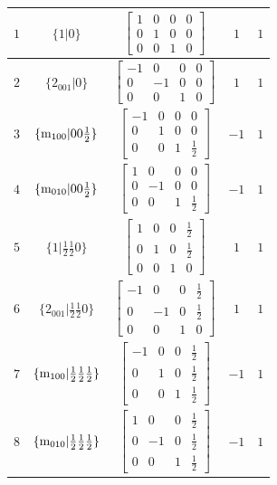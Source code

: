\documentclass[fleqn,8pt]{jsarticle}
\begin{document}
\begin{longtable}{ccccc}
$ 1 $ & $ \{1|0\} $ & $ \begin{bmatrix} 1 & 0 & 0 & 0 \\ 0 & 1 & 0 & 0 \\ 0 & 0 & 1 & 0 \end{bmatrix} $ & $ 1 $ & $ 1 $ \\ \hline
$ 2 $ & $ \{2{}_{001}|0\} $ & $ \begin{bmatrix} -1 & 0 & 0 & 0 \\ 0 & -1 & 0 & 0 \\ 0 & 0 & 1 & 0 \end{bmatrix} $ & $ 1 $ & $ 1 $ \\ \hline
$ 3 $ & $ \{{\rm m}_{100}|0 0 \frac{1}{2}\} $ & $ \begin{bmatrix} -1 & 0 & 0 & 0 \\ 0 & 1 & 0 & 0 \\ 0 & 0 & 1 & \frac{1}{2} \end{bmatrix} $ & $ -1 $ & $ 1 $ \\ \hline
$ 4 $ & $ \{{\rm m}_{010}|0 0 \frac{1}{2}\} $ & $ \begin{bmatrix} 1 & 0 & 0 & 0 \\ 0 & -1 & 0 & 0 \\ 0 & 0 & 1 & \frac{1}{2} \end{bmatrix} $ & $ -1 $ & $ 1 $ \\ \hline
$ 5 $ & $ \{1|\frac{1}{2} \frac{1}{2} 0\} $ & $ \begin{bmatrix} 1 & 0 & 0 & \frac{1}{2} \\ 0 & 1 & 0 & \frac{1}{2} \\ 0 & 0 & 1 & 0 \end{bmatrix} $ & $ 1 $ & $ 1 $ \\ \hline
$ 6 $ & $ \{2{}_{001}|\frac{1}{2} \frac{1}{2} 0\} $ & $ \begin{bmatrix} -1 & 0 & 0 & \frac{1}{2} \\ 0 & -1 & 0 & \frac{1}{2} \\ 0 & 0 & 1 & 0 \end{bmatrix} $ & $ 1 $ & $ 1 $ \\ \hline
$ 7 $ & $ \{{\rm m}_{100}|\frac{1}{2} \frac{1}{2} \frac{1}{2}\} $ & $ \begin{bmatrix} -1 & 0 & 0 & \frac{1}{2} \\ 0 & 1 & 0 & \frac{1}{2} \\ 0 & 0 & 1 & \frac{1}{2} \end{bmatrix} $ & $ -1 $ & $ 1 $ \\ \hline
$ 8 $ & $ \{{\rm m}_{010}|\frac{1}{2} \frac{1}{2} \frac{1}{2}\} $ & $ \begin{bmatrix} 1 & 0 & 0 & \frac{1}{2} \\ 0 & -1 & 0 & \frac{1}{2} \\ 0 & 0 & 1 & \frac{1}{2} \end{bmatrix} $ & $ -1 $ & $ 1 $ \\ \hline

\end{longtable}
\end{document}
